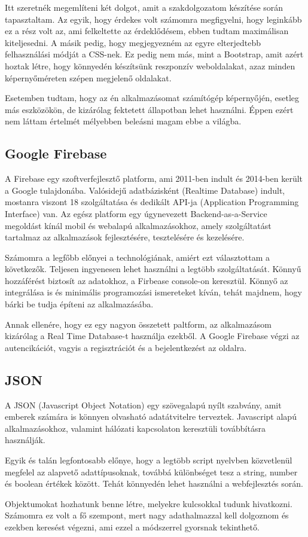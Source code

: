 Itt szeretnék megemlíteni két dolgot, amit a szakdolgozatom készítése során tapasztaltam. Az egyik, hogy érdekes volt számomra megfigyelni, hogy leginkább ez a rész volt az, ami felkeltette az érdeklődésem, ebben tudtam maximálisan kiteljesedni. A másik pedig, hogy megjegyezném az egyre elterjedtebb felhasználási módját a CSS-nek. Ez pedig nem más, mint a Bootstrap, amit azért hoztak létre, hogy könnyedén készítsünk reszponzív weboldalakat, azaz minden képernyőméreten szépen megjelenő oldalakat.

Esetemben tudtam, hogy az én alkalmazásomat számítógép képernyőjén, esetleg más eszközökön, de kizárólag fektetett állapotban lehet használni. Éppen ezért nem láttam értelmét mélyebben beleásni magam ebbe a világba.

\subsection{Google Firebase}
A Firebase egy szoftverfejlesztő platform, ami 2011-ben indult és 2014-ben került a Google tulajdonába. Valósidejű adatbázisként (Realtime Database) indult, mostanra viszont 18 szolgáltatása és dedikált API-ja (Application Programming Interface) van. Az egész platform egy úgynevezett Backend-as-a-Service megoldást kínál mobil és webalapú alkalmazásokhoz, amely szolgáltatást tartalmaz az alkalmazások fejlesztésére, tesztelésére és kezelésére. 

Számomra a legfőbb előnyei a technológiának, amiért ezt választottam a következők. Teljesen ingyenesen lehet használni a legtöbb szolgáltatását. Könnyű hozzáférést biztosít az adatokhoz, a Firbease console-on keresztül. Könnyő az integrálása is és minimális programozási ismereteket kíván, tehát majdnem, hogy bárki be tudja építeni az alkalmazásába.

Annak ellenére, hogy ez egy nagyon összetett paltform, az alkalmazásom kizárólag a Real Time Database-t használja ezekből. A Google Firebase végzi az autencikációt, vagyis a regisztrációt és a bejelentkezést az oldalra.

\subsection{JSON}
A JSON (Javascript Object Notation) egy szövegalapú nyílt szabvány, amit emberek számára is könnyen olvasható adatátvitelre terveztek. Javascript alapú alkalmazásokhoz, valamint hálózati kapcsolaton keresztüli továbbításra használják. 

Egyik és talán legfontosabb előnye, hogy a legtöbb script nyelvben közvetlenül megfelel az alapvető adattípusoknak, továbbá különbséget tesz a string, number és boolean értékek között. Tehát könnyedén lehet használni a webfejlesztés során. 

Objektumokat hozhatunk benne létre, melyekre kulcsokkal tudunk hivatkozni. Számomra ez volt a fő szempont, mert nagy adathalmazzal kell dolgoznom és ezekben keresést végezni, ami ezzel a módszerrel gyorsnak tekinthető.